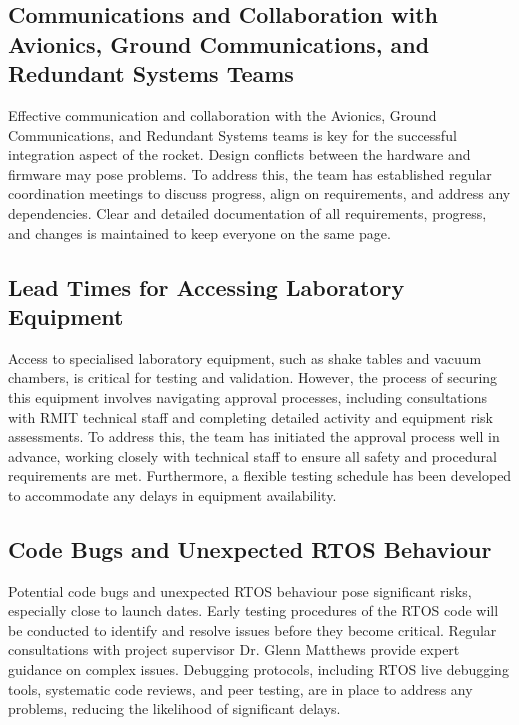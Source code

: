 \subsection{Communications and Collaboration with Avionics, Ground Communications, and Redundant Systems Teams}
Effective communication and collaboration with the Avionics, Ground Communications, and Redundant Systems teams is key for the successful integration aspect of the rocket. Design conflicts between the hardware and firmware may pose problems. To address this, the team has established regular coordination meetings to discuss progress, align on requirements, and address any dependencies. Clear and detailed documentation of all requirements, progress, and changes is maintained to keep everyone on the same page. 

\subsection{Lead Times for Accessing Laboratory Equipment}
Access to specialised laboratory equipment, such as shake tables and vacuum chambers, is critical for testing and validation. However, the process of securing this equipment involves navigating approval processes, including consultations with RMIT technical staff and completing detailed activity and equipment risk assessments. To address this, the team has initiated the approval process well in advance, working closely with technical staff to ensure all safety and procedural requirements are met. Furthermore, a flexible testing schedule has been developed to accommodate any delays in equipment availability. 

\subsection{Code Bugs and Unexpected RTOS Behaviour}
Potential code bugs and unexpected RTOS behaviour pose significant risks, especially close to launch dates. Early testing procedures of the RTOS code will be conducted to identify and resolve issues before they become critical. Regular consultations with project supervisor Dr. Glenn Matthews provide expert guidance on complex issues. Debugging protocols, including RTOS live debugging tools, systematic code reviews, and peer testing, are in place to address any problems, reducing the likelihood of significant delays.

